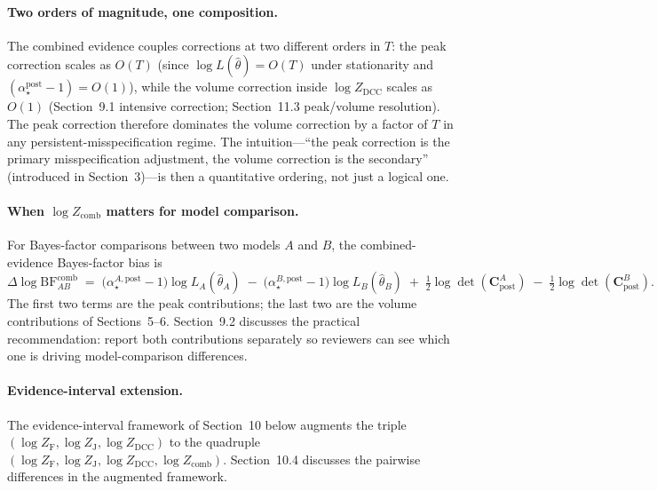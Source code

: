 \documentclass[11pt]{article}
\begin{document}
\paragraph{Two orders of magnitude, one composition.}
The combined evidence couples corrections at two different orders in $T$:
the peak correction scales as $O(T)$ (since $\log L(\hat\theta) = O(T)$ under
stationarity and $(\alpha_\star^{\mathrm{post}}-1) = O(1)$), while the volume
correction inside $\log Z_{\mathrm{DCC}}$ scales as $O(1)$ (Section~9.1
intensive correction; Section~11.3 peak/volume resolution). The peak
correction therefore dominates the volume correction by a factor of $T$
in any persistent-misspecification regime. The intuition---``the peak
correction is the primary misspecification adjustment, the volume
correction is the secondary'' (introduced in Section~3)---is then a
quantitative ordering, not just a logical one.

\paragraph{When $\log Z_{\mathrm{comb}}$ matters for model comparison.}
For Bayes-factor comparisons between two models $A$ and $B$, the
combined-evidence Bayes-factor bias is
\begin{equation}
\Delta \log\mathrm{BF}_{AB}^{\mathrm{comb}}
\;=\;
\bigl(\alpha_\star^{A,\mathrm{post}}-1\bigr)\log L_A(\hat\theta_A)
\;-\;
\bigl(\alpha_\star^{B,\mathrm{post}}-1\bigr)\log L_B(\hat\theta_B)
\;+\;
\tfrac{1}{2}\log\det(\mathbf C_{\mathrm{post}}^{A})
\;-\;
\tfrac{1}{2}\log\det(\mathbf C_{\mathrm{post}}^{B}).
\label{eq:logBF-comb}
\end{equation}
The first two terms are the peak contributions; the last two are the volume
contributions of Sections~5--6. Section~9.2 discusses the practical
recommendation: report both contributions separately so reviewers can see
which one is driving model-comparison differences.

\paragraph{Evidence-interval extension.}
The evidence-interval framework of Section~10 below augments the triple
$(\log Z_{\mathrm{F}}, \log Z_{\mathrm{J}}, \log Z_{\mathrm{DCC}})$ to the
quadruple $(\log Z_{\mathrm{F}}, \log Z_{\mathrm{J}}, \log Z_{\mathrm{DCC}},
\log Z_{\mathrm{comb}})$. Section~10.4 discusses the pairwise differences in
the augmented framework.
\end{document}
